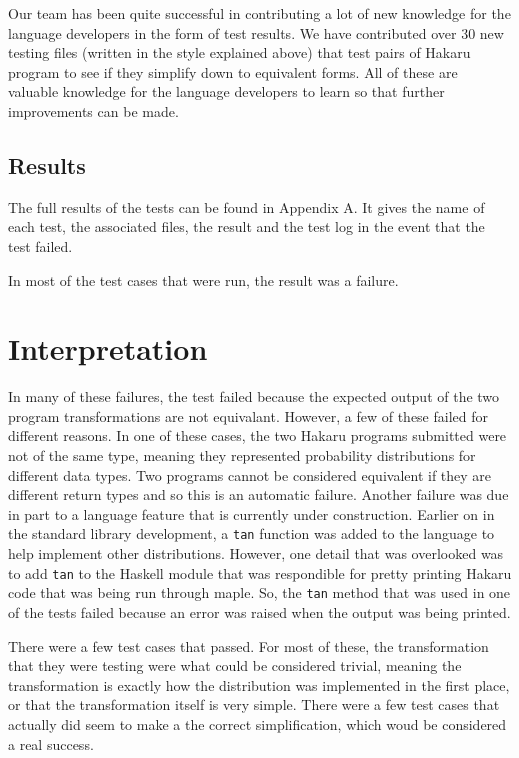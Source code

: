 \documentclass[11pt]{article}
\begin{document}
Our team has been quite successful in contributing a lot of new knowledge for the language developers in the form of test results. We have contributed over 30 new testing files (written in the style explained above) that test pairs of Hakaru program to see if they simplify down to equivalent forms. All of these are valuable knowledge for the language developers to learn so that further improvements can be made.

\subsection{Results}

\justifying

The full results of the tests can be found in Appendix A. It gives the name of each test, the associated files, the result and the test log in the event that the test failed.

In most of the test cases that were run, the result was a failure. 


\section{Interpretation}

In many of these failures, the test failed because the expected output of the two program transformations are not equivalant. However, a few of these failed for different reasons. In one of these cases, the two Hakaru programs submitted were not of the same type, meaning they represented probability distributions for different data types. Two programs cannot be considered equivalent if they are different return types and so this is an automatic failure. Another failure was due in part to a language feature that is currently under construction. Earlier on in the standard library development, a {\tt tan} function was added to the language to help implement other distributions. However, one detail that was overlooked was to add {\tt tan} to the Haskell module that was respondible for pretty printing Hakaru code that was being run through maple. So, the {\tt tan} method that was used in one of the tests failed because an error was raised when the output was being printed. 

There were a few test cases that passed. For most of these, the transformation that they were testing were what could be considered trivial, meaning the transformation is exactly how the distribution was implemented in the first place, or that the transformation itself is very simple. There were a few test cases that actually did seem to make a the correct simplification, which woud be considered a real success.
\end{document}
